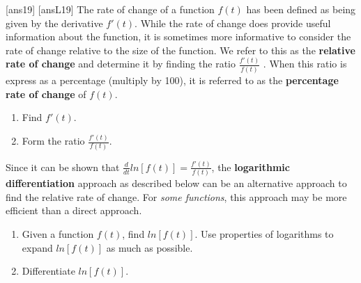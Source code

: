 
\newpage
[ans19]
[ansL19]
\noindent The rate of change of a function $f(t)$ has been defined as being given by the derivative $f'(t)$.  While the rate of change does provide useful information about the function, it is sometimes more informative to consider the rate of change relative to the size of the function.  We refer to this as the \textbf{relative rate of change} and determine it by finding the ratio $\displaystyle\frac{f'(t)}{f(t)}$ .  When this ratio is express as a percentage (multiply by 100), it is referred to as the \textbf{percentage rate of change} of $f(t)$. 

\begin{tcolorbox}[title = {Finding Relative Rate of Change (Direct Approach)}]

\begin{enumerate}[leftmargin=*]
    \item Find $f'(t)$.
    \item Form the ratio $\displaystyle\frac{f'(t)}{f(t)}$.
\end{enumerate}

\end{tcolorbox}

\noindent Since it can be shown that $\displaystyle\frac{d}{dt}ln[f(t)]=\displaystyle\frac{f'(t)}{f(t)}$, the \textbf{logarithmic differentiation} approach as described below can be an alternative approach to find the relative rate of change. For \emph{some functions}, this approach  may be more efficient than a direct approach.\\

\begin{tcolorbox}[title = {Finding Relative Rate of Change (Logarithmic Differentiation Approach)}]

\begin{enumerate}[leftmargin=*]
    \item Given a function $f(t)$, find $ln[f(t)]$. Use properties of logarithms to expand $ln[f(t)]$ as much as possible.
    \item Differentiate $ln[f(t)]$.
\end{enumerate}

\end{tcolorbox}
 
